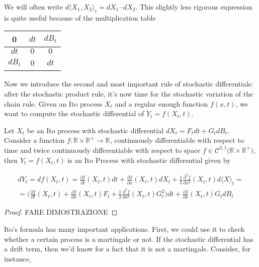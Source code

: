 We will often write $d\langle X_1,X_2 \rangle_t = dX_1 \cdot dX_2$. This slightly less rigorous expression is quite useful because of the multiplication table

\begin{table}[h!]
    \centering
    \begin{tabular}{c|c c}
        0 & $dt$ & $dB_t$ \\
        \hline
        $dt$ & $0$ & $0$ \\
        $dB_t$ & 0 & $dt$
    \end{tabular}
\end{table}

Now we introduce the second and most important rule of stochastic differentials: after the stochastic product rule, it's now time for the stochastic variation of the chain rule. Given an Ito process $X_t$ and a regular enough function $f(x,t)$, we want to compute the stochastic differential of $Y_t = f(X_t,t)$. 

\begin{theorem}
    Let $X_t$ be an Ito process with stochastic differential $dX_t = F_t dt + G_t dB_t$. Consider a function $f : \mathbb{R} \times \mathbb{R}^+ \to \mathbb{R}$, continuously differentiable with respect to time and twice continuously differentiable with respect to space $f \in \mathcal{C}^{2,1}\big(\mathbb{R} \times \mathbb{R}^+\big)$, then $Y_t = f(X_t,t)$ is an Ito Process with stochastic differential given by

    \begin{gather}
        dY_t = df(X_t,t) = \frac{\partial f}{\partial t}(X_t, t)dt+\frac{\partial f}{\partial x}(X_t,t) dX_t + \frac{1}{2}\frac{\partial^2 f}{\partial x^2}(X_t,t) d\langle X \rangle_t = \\
        = \Big( \frac{\partial f}{\partial t}(X_t,t) + \frac{\partial f}{\partial x}(X_t,t) F_t + \frac{1}{2} \frac{\partial^2 f}{\partial x^2}(X_t,t) G_t^2 \Big) dt + \frac{\partial f}{\partial x}(X_t,t) G_t dB_t
    \end{gather}
\end{theorem}
\begin{proof}
    FARE DIMOSTRAZIONE
\end{proof}

Ito's formula has many important applications. First, we could use it to check whether a certain process is a martingale or not. If the stochastic differential has a drift term, then we'd know for a fact that it is not a martingale. Consider, for instance,


